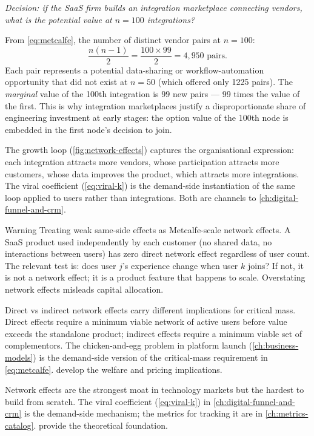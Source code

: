 \begin{example}
\emph{Decision: if the SaaS firm builds an integration marketplace connecting vendors,
what is the potential value at \(n = 100\) integrations?}

From \cref{eq:metcalfe}, the number of distinct vendor pairs at \(n = 100\):
\[
  \frac{n(n-1)}{2} = \frac{100 \times 99}{2} = 4{,}950 \text{ pairs}.
\]
Each pair represents a potential data-sharing or workflow-automation opportunity that did
not exist at \(n = 50\) (which offered only \num{1225} pairs). The \emph{marginal}
value of the 100th integration is \(99\) new pairs --- 99 times the value of the first.
This is why integration marketplaces justify a disproportionate share of engineering
investment at early stages: the option value of the 100th node is embedded in the
first node's decision to join.

The growth loop (\cref{fig:network-effects}) captures the organisational expression: each
integration attracts more vendors, whose participation attracts more customers, whose
data improves the product, which attracts more integrations. The viral coefficient
(\cref{eq:viral-k}) is the demand-side instantiation of the same loop applied to users
rather than integrations. Both are channels to \cref{ch:digital-funnel-and-crm}.
\end{example}

\begin{admonition}{Warning}
Treating weak same-side effects as Metcalfe-scale network effects. A SaaS product used
independently by each customer (no shared data, no interactions between users) has zero
direct network effect regardless of user count. The relevant test is: does user \(j\)'s
experience change when user \(k\) joins? If not, it is not a network effect; it is a
product feature that happens to scale. Overstating network effects misleads capital
allocation.
\end{admonition}

Direct vs indirect network effects carry different implications for critical mass.
Direct effects require a minimum viable network of active users before value exceeds the
standalone product; indirect effects require a minimum viable set of complementors.
The chicken-and-egg problem in platform launch (\cref{ch:business-models}) is the
demand-side version of the critical-mass requirement in \cref{eq:metcalfe}.
\parencite{dranove7theconomics} develop the welfare and pricing implications.

Network effects are the strongest moat in technology markets but the hardest to build from
scratch. The viral coefficient (\cref{eq:viral-k}) in \cref{ch:digital-funnel-and-crm}
is the demand-side mechanism; the metrics for tracking it are in \cref{ch:metrics-catalog}.
\textcite{dranove7theconomics} provide the theoretical foundation.

